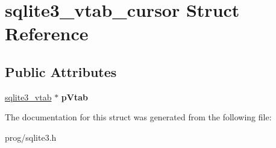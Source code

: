 \hypertarget{structsqlite3__vtab__cursor}{}\section{sqlite3\+\_\+vtab\+\_\+cursor Struct Reference}
\label{structsqlite3__vtab__cursor}
\subsection*{Public Attributes}
\begin{DoxyCompactItemize}
\item 
\mbox{\label{structsqlite3__vtab__cursor_a2989d9f84a35506c3ef9fe9e9ecd3365}} 
\mbox{\hyperlink{structsqlite3__vtab}{sqlite3\+\_\+vtab}} $\ast$ {\bfseries p\+Vtab}
\end{DoxyCompactItemize}


The documentation for this struct was generated from the following file\+:\begin{DoxyCompactItemize}
\item 
prog/sqlite3.\+h\end{DoxyCompactItemize}
